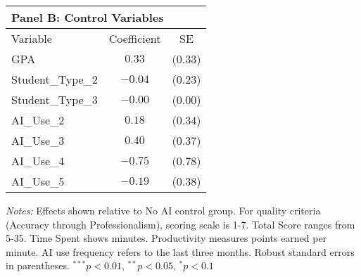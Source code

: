 \begin{table}[!htbp]
\vspace{0.3cm}

\begin{tabular}{lcc}
\multicolumn{3}{l}{\textbf{Panel B: Control Variables}} \\
\hline\hline
Variable & Coefficient & SE \\
\hline
GPA & $0.33$ & ($0.33$) \\
Student_Type_2 & $-0.04$ & ($0.23$) \\
Student_Type_3 & $-0.00$ & ($0.00$) \\
AI_Use_2 & $0.18$ & ($0.34$) \\
AI_Use_3 & $0.40$ & ($0.37$) \\
AI_Use_4 & $-0.75$ & ($0.78$) \\
AI_Use_5 & $-0.19$ & ($0.38$) \\
\hline
\end{tabular}
\begin{tablenotes}
\small
\item \textit{Notes:} Effects shown relative to No AI control group. For quality criteria (Accuracy through Professionalism), scoring scale is 1-7. Total Score ranges from 5-35. Time Spent shows minutes. Productivity measures points earned per minute. AI use frequency refers to the last three months. Robust standard errors in parentheses. $^{***}p<0.01$, $^{**}p<0.05$, $^{*}p<0.1$
\end{tablenotes}
\end{table}